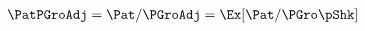   \begin{align}
    \PatPGroAdj  & = \Pat/\PGroAdj = \Ex[\Pat/\PGro\pShk]  \label{eq:GPFNrm}
  \end{align}
